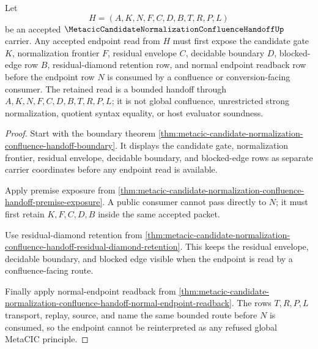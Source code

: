 \begin{theorem}
\label{thm:metacic-candidate-normalization-confluence-handoff-normal-endpoint-retention}
Let
$$
H=(A,K,N,F,C,D,B,T,R,P,L)
$$
be an accepted $\MetacicCandidateNormalizationConfluenceHandoffUp$ carrier. Any accepted endpoint read from $H$ must first expose the candidate gate $K$, normalization frontier $F$, residual envelope $C$, decidable boundary $D$, blocked-edge row $B$, residual-diamond retention row, and normal endpoint readback row before the endpoint row $N$ is consumed by a confluence or conversion-facing consumer. The retained read is a bounded handoff through $A,K,N,F,C,D,B,T,R,P,L$; it is not global confluence, unrestricted strong normalization, quotient syntax equality, or host evaluator soundness.
\end{theorem}
\begin{proof}
Start with the boundary theorem \autoref{thm:metacic-candidate-normalization-confluence-handoff-boundary}. It displays the candidate gate, normalization frontier, residual envelope, decidable boundary, and blocked-edge rows as separate carrier coordinates before any endpoint read is available.

Apply premise exposure from \autoref{thm:metacic-candidate-normalization-confluence-handoff-premise-exposure}. A public consumer cannot pass directly to $N$; it must first retain $K,F,C,D,B$ inside the same accepted packet.

Use residual-diamond retention from \autoref{thm:metacic-candidate-normalization-confluence-handoff-residual-diamond-retention}. This keeps the residual envelope, decidable boundary, and blocked edge visible when the endpoint is read by a confluence-facing route.

Finally apply normal-endpoint readback from \autoref{thm:metacic-candidate-normalization-confluence-handoff-normal-endpoint-readback}. The rows $T,R,P,L$ transport, replay, source, and name the same bounded route before $N$ is consumed, so the endpoint cannot be reinterpreted as any refused global MetaCIC principle.
\end{proof}

